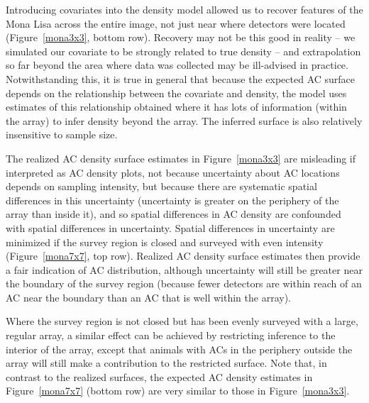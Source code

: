 \documentclass[useAMS,usenatbib,referee]{biom}
\begin{document}
Introducing covariates into the density model allowed us to recover features of the Mona Lisa across the entire image, not just near where detectors were located (Figure~\ref{mona3x3}, bottom row). Recovery may not be this good in reality -- we simulated our covariate to be strongly related to true density -- and extrapolation so far beyond the area where data was collected may be ill-advised in practice. Notwithstanding this, it is true in general that because the expected AC surface depends on the relationship between the covariate and density, the model uses estimates of this relationship obtained where it has lots of information (within the array) to infer density beyond the array. The inferred surface is also relatively insensitive to sample size.

The realized AC density surface estimates in Figure~\ref{mona3x3} are misleading if interpreted as AC density plots, not because uncertainty about AC locations depends on sampling intensity, but because there are systematic spatial differences in this uncertainty (uncertainty is greater on the periphery of the array than inside it), and so spatial differences in AC density are confounded with spatial differences in uncertainty. Spatial differences in uncertainty are minimized if the survey region is closed and surveyed with even intensity (Figure~\ref{mona7x7}, top row). Realized AC density surface estimates then provide a fair indication of AC distribution, although uncertainty will still be greater near the boundary of the survey region (because fewer detectors are within reach of an AC near the boundary than an AC that is well within the array). 

Where the survey region is not closed but has been evenly surveyed with a large, regular array, a similar effect can be achieved by restricting inference to the interior of the array, except that animals with ACs in the periphery outside the array will still make a contribution to the restricted surface. Note that, in contrast to the realized surfaces, the expected AC density estimates in Figure~\ref{mona7x7} (bottom row) are very similar to those in Figure~\ref{mona3x3}. 
\end{document}
